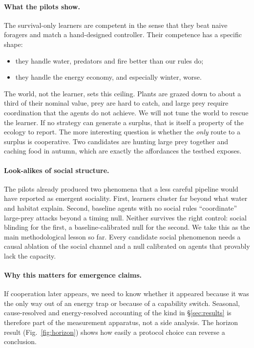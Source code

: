 \documentclass[10pt]{article}
\begin{document}
\paragraph{What the pilots show.}
The survival-only learners are competent in the sense that they beat naive foragers and match a hand-designed
controller. Their competence has a specific shape:
\begin{itemize}
\item they handle water, predators and fire better than our rules do;
\item they handle the energy economy, and especially winter, worse.
\end{itemize}
The world, not the learner, sets this ceiling. Plants are grazed down to about a third of their nominal value, prey
are hard to catch, and large prey require coordination that the agents do not achieve. We will not tune the world to
rescue the learner. If no strategy can generate a surplus, that is itself a property of the ecology to report. The
more interesting question is whether the \emph{only} route to a surplus is cooperative. Two candidates are hunting
large prey together and caching food in autumn, which are exactly the affordances the testbed exposes.

\paragraph{Look-alikes of social structure.}
The pilots already produced two phenomena that a less careful pipeline would have reported as emergent sociality.
First, learners cluster far beyond what water and habitat explain. Second, baseline agents with no social rules
``coordinate'' large-prey attacks beyond a timing null. Neither survives the right control: social blinding for the
first, a baseline-calibrated null for the second. We take this as the main methodological lesson so far. Every
candidate social phenomenon needs a causal ablation of the social channel and a null calibrated on agents that
provably lack the capacity.

\paragraph{Why this matters for emergence claims.}
If cooperation later appears, we need to know whether it appeared because it was the only way out of an energy trap
or because of a capability switch. Seasonal, cause-resolved and energy-resolved accounting of the kind in
\S\ref{sec:results} is therefore part of the measurement apparatus, not a side analysis. The horizon result
(Fig.~\ref{fig:horizon}) shows how easily a protocol choice can reverse a conclusion.
\end{document}
